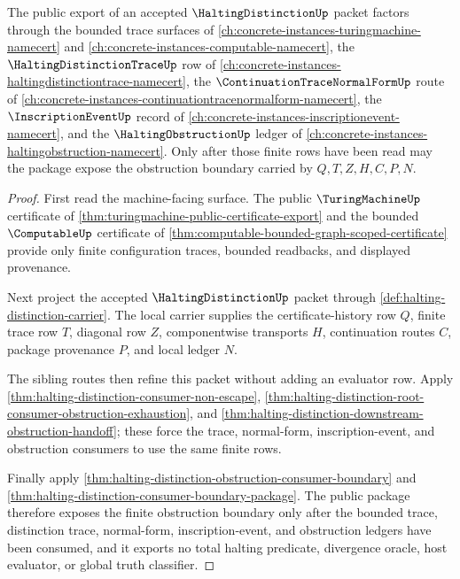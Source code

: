 \begin{theorem}
\label{thm:halting-distinction-public-export-package}
The public export of an accepted $\HaltingDistinctionUp$ packet factors through
the bounded trace surfaces of \autoref{ch:concrete-instances-turingmachine-namecert}
and \autoref{ch:concrete-instances-computable-namecert}, the
$\HaltingDistinctionTraceUp$ row of
\autoref{ch:concrete-instances-haltingdistinctiontrace-namecert}, the
$\ContinuationTraceNormalFormUp$ route of
\autoref{ch:concrete-instances-continuationtracenormalform-namecert}, the
$\InscriptionEventUp$ record of
\autoref{ch:concrete-instances-inscriptionevent-namecert}, and the
$\HaltingObstructionUp$ ledger of
\autoref{ch:concrete-instances-haltingobstruction-namecert}. Only after those
finite rows have been read may the package expose the obstruction boundary
carried by $Q,T,Z,H,C,P,N$.
\end{theorem}
\begin{proof}
First read the machine-facing surface. The public $\TuringMachineUp$ certificate
of \autoref{thm:turingmachine-public-certificate-export} and the bounded
$\ComputableUp$ certificate of
\autoref{thm:computable-bounded-graph-scoped-certificate} provide only finite
configuration traces, bounded readbacks, and displayed provenance.

Next project the accepted $\HaltingDistinctionUp$ packet through
\autoref{def:halting-distinction-carrier}. The local carrier supplies the
certificate-history row $Q$, finite trace row $T$, diagonal row $Z$,
componentwise transports $H$, continuation routes $C$, package provenance $P$,
and local ledger $N$.

The sibling routes then refine this packet without adding an evaluator row.
Apply \autoref{thm:halting-distinction-consumer-non-escape},
\autoref{thm:halting-distinction-root-consumer-obstruction-exhaustion}, and
\autoref{thm:halting-distinction-downstream-obstruction-handoff}; these force
the trace, normal-form, inscription-event, and obstruction consumers to use the
same finite rows.

Finally apply \autoref{thm:halting-distinction-obstruction-consumer-boundary}
and \autoref{thm:halting-distinction-consumer-boundary-package}. The public
package therefore exposes the finite obstruction boundary only after the
bounded trace, distinction trace, normal-form, inscription-event, and
obstruction ledgers have been consumed, and it exports no total halting
predicate, divergence oracle, host evaluator, or global truth classifier.
\end{proof}
